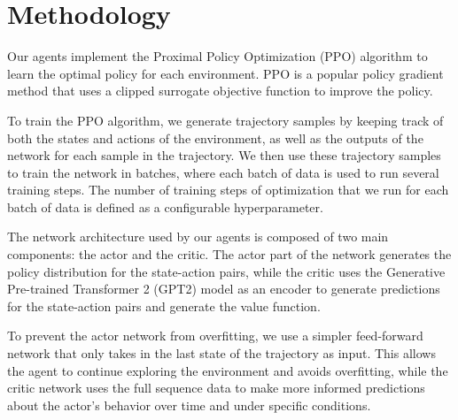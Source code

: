\section{Methodology}
\label{sec:methodology}

Our agents implement the Proximal Policy Optimization (PPO) algorithm to learn the optimal policy for each environment. PPO is a popular policy gradient method that uses a clipped surrogate objective function to improve the policy.

To train the PPO algorithm, we generate trajectory samples by keeping track of both the states and actions of the environment, as well as the outputs of the network for each sample in the trajectory. We then use these trajectory samples to train the network in batches, where each batch of data is used to run several training steps. The number of training steps of optimization that we run for each batch of data is defined as a configurable hyperparameter.

The network architecture used by our agents is composed of two main components: the actor and the critic. The actor part of the network generates the policy distribution for the state-action pairs, while the critic uses the Generative Pre-trained Transformer 2 (GPT2) model as an encoder to generate predictions for the state-action pairs and generate the value function.

To prevent the actor network from overfitting, we use a simpler feed-forward network that only takes in the last state of the trajectory as input. This allows the agent to continue exploring the environment and avoids overfitting, while the critic network uses the full sequence data to make more informed predictions about the actor's behavior over time and under specific conditions.


